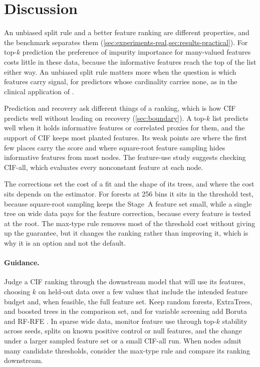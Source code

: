 \section{Discussion}
\label{sec:discussion}

An unbiased split rule and a better feature ranking are different properties,
and the benchmark separates them (\cref{sec:experiments-real,sec:results-practical}).
For top-$k$ prediction the preference of impurity importance for many-valued
features costs little in these data, because the informative features reach the
top of the list either way. An unbiased split rule matters more when the
question is which features carry signal, for predictors whose cardinality
carries none, as in the clinical application of
\citet{MilletichDownesHirst2026citrees}.

Prediction and recovery ask different things of a ranking, which is how CIF
predicts well without leading on recovery (\cref{sec:boundary}). A top-$k$ list
predicts well when it holds informative features or correlated proxies for
them, and the support of CIF keeps most planted features. Its weak points
are where the first few places carry the score and where square-root feature
sampling hides informative features from most nodes. The feature-use
study suggests checking CIF-all, which evaluates every nonconstant feature at
each node.

The corrections set the cost of a fit and the shape of its trees, and where the
cost sits depends on the estimator. For forests at 256 bins it sits in the
threshold test, because square-root sampling keeps the Stage~A feature set
small, while a single tree on wide data pays for the feature correction,
because every feature is tested at the root. The max-type rule removes most of
the threshold cost without giving up the guarantee, but it changes the ranking
rather than improving it, which is why it is an option and not the default.

\paragraph{Guidance.}
Judge a CIF ranking through the downstream model that will use its features,
choosing $k$ on held-out data over a few values that include the intended
feature budget and, when feasible, the full feature set. Keep random forests,
ExtraTrees, and boosted trees in the comparison set, and for variable screening
add Boruta and RF-RFE
\citep{GenuerPoggiTuleauMalot2010VariableSelectionUsingRandomForests}. In
sparse wide data, monitor feature use through top-$k$ stability across seeds,
splits on known positive control or null features, and the change under a
larger sampled feature set or a small CIF-all run. When nodes admit many
candidate thresholds, consider the max-type rule and compare its ranking
downstream.

